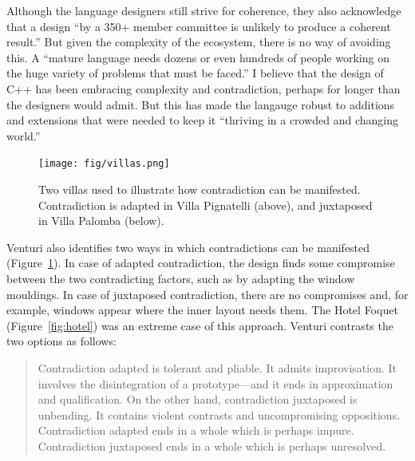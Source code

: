 Although the language designers still strive for coherence, they also acknowledge that
a design ``by a 350+ member committee is unlikely to produce a coherent result.'' But given
the complexity of the ecosystem, there is no way of avoiding this. A  ``mature language needs
dozens or even hundreds of people working on the huge variety of problems that must be
faced.'' I believe that the
design of C++ has been embracing complexity and contradiction, perhaps for longer than the
designers would admit. But this has made the langauge robust to additions and extensions that
were needed to keep it ``thriving in a crowded and changing world.''


\begin{figure}
\centering
\begin{minipage}[t]{.5\textwidth}%
\vspace{0em}
\raggedleft
\vspace{-1em}
\texttt{[image: fig/villas.png]}
\end{minipage}\quad\quad
\begin{minipage}[t]{.4\textwidth}
\caption{Two villas used to illustrate how contradiction can be manifested. Contradiction is
  adapted in Villa Pignatelli (above), and juxtaposed in Villa Palomba (below).}
\label{fig:villas}
\end{minipage}
\end{figure}

Venturi also identifies two ways in which contradictions can be manifested (Figure~\ref{fig:villas}).
In case of adapted contradiction, the design finds some compromise between the two contradicting
factors, such as by adapting the window mouldings. In case of juxtaposed contradiction, there are
no compromises and, for example, windows appear where the inner layout needs them. The Hotel
Foquet (Figure~\ref{fig:hotel}) was an extreme case of this approach. Venturi contrasts the two
options as follows:

\begin{quote}
Contradiction adapted is tolerant and pliable. It admits improvisation. It involves the
disintegration of a prototype---and it ends in approximation and qualification. On the other
hand, contradiction juxtaposed is unbending. It contains violent contrasts and uncompromising
oppositions. Contradiction adapted ends in a whole which is perhaps impure. Contradiction
juxtaposed ends in a whole which is perhaps unresolved.
\end{quote}

